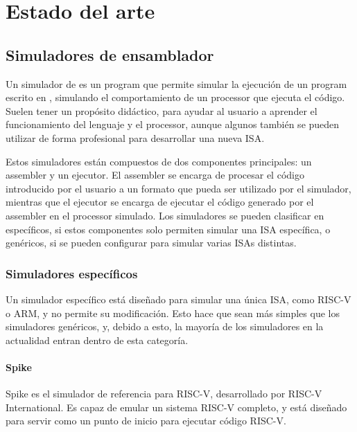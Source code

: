 \chapter{Estado del arte}\label{chap:state-of-the-art}

\section{Simuladores de ensamblador}

Un simulador de  es un \gls{program} que permite
simular la ejecución de un \gls{program} escrito en ,
simulando el comportamiento de un \gls{processor} que ejecuta el código. Suelen
tener un propósito didáctico, para ayudar al usuario a aprender el
funcionamiento del lenguaje y el \gls{processor}, aunque algunos también se
pueden utilizar de forma profesional para desarrollar una nueva \gls{ISA}.

Estos simuladores están compuestos de dos componentes principales: un
\gls{assembler} y un ejecutor. El \gls{assembler} se encarga de procesar el
código  introducido por el usuario a un formato
que pueda ser utilizado por el simulador, mientras que el ejecutor se encarga
de ejecutar el código generado por el \gls{assembler} en el \gls{processor}
simulado. Los simuladores se pueden clasificar en específicos, si estos componentes
solo permiten simular una \gls{ISA} específica, o genéricos, si se pueden
configurar para simular varias \glspl{ISA} distintas.

\subsection{Simuladores específicos}

Un simulador específico está diseñado para simular una única \gls{ISA}, como
RISC-V o ARM, y no permite su modificación. Esto hace que sean más simples que
los simuladores genéricos, y, debido a esto, la mayoría de los simuladores en la
actualidad entran dentro de esta categoría.

\subsubsection{Spike}

Spike \parencite{spike} es el simulador de referencia para RISC-V, desarrollado
por RISC-V International. Es capaz de emular un sistema RISC-V completo, y está
diseñado para servir como un punto de inicio para ejecutar código RISC-V.


